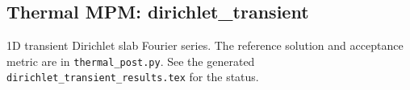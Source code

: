 \subsection{Thermal MPM: dirichlet\_transient}
1D transient Dirichlet slab Fourier series. The reference solution and acceptance metric are in \texttt{thermal\_post.py}. See the generated \texttt{dirichlet\_transient\_results.tex} for the status.
